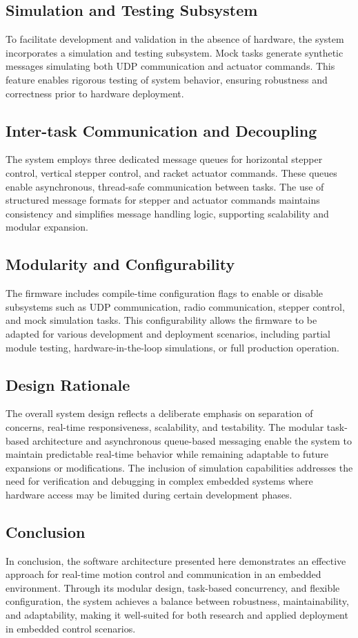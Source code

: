 \subsection{Simulation and Testing Subsystem}
To facilitate development and validation in the absence of hardware, the system incorporates a simulation and testing subsystem. Mock tasks generate synthetic messages simulating both UDP communication and actuator commands. This feature enables rigorous testing of system behavior, ensuring robustness and correctness prior to hardware deployment.

\subsection{Inter-task Communication and Decoupling}
The system employs three dedicated message queues for horizontal stepper control, vertical stepper control, and racket actuator commands. These queues enable asynchronous, thread-safe communication between tasks. The use of structured message formats for stepper and actuator commands maintains consistency and simplifies message handling logic, supporting scalability and modular expansion.

\subsection{Modularity and Configurability}
The firmware includes compile-time configuration flags to enable or disable subsystems such as UDP communication, radio communication, stepper control, and mock simulation tasks. This configurability allows the firmware to be adapted for various development and deployment scenarios, including partial module testing, hardware-in-the-loop simulations, or full production operation.

\subsection{Design Rationale}
The overall system design reflects a deliberate emphasis on separation of concerns, real-time responsiveness, scalability, and testability. The modular task-based architecture and asynchronous queue-based messaging enable the system to maintain predictable real-time behavior while remaining adaptable to future expansions or modifications. The inclusion of simulation capabilities addresses the need for verification and debugging in complex embedded systems where hardware access may be limited during certain development phases.

\subsection{Conclusion}
In conclusion, the software architecture presented here demonstrates an effective approach for real-time motion control and communication in an embedded environment. Through its modular design, task-based concurrency, and flexible configuration, the system achieves a balance between robustness, maintainability, and adaptability, making it well-suited for both research and applied deployment in embedded control scenarios.